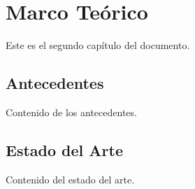 \chapter{Marco Teórico}
Este es el segundo capítulo del documento.

\section{Antecedentes}
Contenido de los antecedentes.

\section{Estado del Arte}
Contenido del estado del arte.